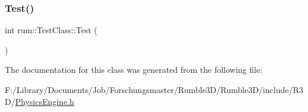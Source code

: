 \subsubsection{\texorpdfstring{Test()}{Test()}}
{\footnotesize\ttfamily int rum\+::\+Test\+Class\+::\+Test (\begin{DoxyParamCaption}{ }\end{DoxyParamCaption})\hspace{0.3cm}{\ttfamily [inline]}}



The documentation for this class was generated from the following file\+:\begin{DoxyCompactItemize}
\item 
F\+:/\+Library/\+Documents/\+Job/\+Forschungsmaster/\+Rumble3\+D/\+Rumble3\+D/include/\+R3\+D/\hyperlink{_physics_engine_8h}{Physics\+Engine.\+h}\end{DoxyCompactItemize}
